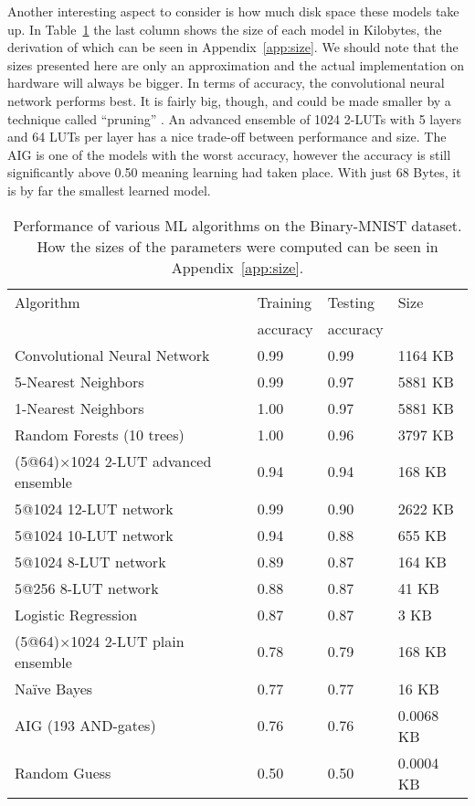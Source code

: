 \noindent Another interesting aspect to consider is how much disk space these models take up. In Table~\ref{tab:ml_algos_on_bmnist} the last column shows the size of each model in Kilobytes, the derivation of which can be seen in Appendix~\ref{app:size}. We should note that the sizes presented here are only an approximation and the actual implementation on hardware will always be bigger. In terms of accuracy, the convolutional neural network performs best. It is fairly big, though, and could be made smaller by a technique called \enquote{pruning} \cite{bib:molchanov2016pruning}. An advanced ensemble of 1024 2-LUTs with 5 layers and 64 LUTs per layer has a nice trade-off between performance and size. The AIG is one of the models with the worst accuracy, however the accuracy is still significantly above 0.50 meaning learning had taken place. With just 68 Bytes, it is by far the smallest learned model.

\begin{table}[!htb]
    \begin{small}
        \begin{tabular}{llll}
        Algorithm & Training    & Testing    & Size               \\
                  & accuracy    & accuracy   &                    \\ \hline
        Convolutional Neural Network & 0.99  & 0.99 & 1164 KB     \\
        5-Nearest Neighbors          & 0.99  & 0.97 & 5881 KB     \\
        1-Nearest Neighbors          & 1.00  & 0.97 & 5881 KB     \\
        Random Forests (10 trees)    & 1.00  & 0.96 & 3797 KB     \\
        (5@64)$\times$1024 2-LUT advanced ensemble    & 0.94  & 0.94 & 168 KB      \\
        5@1024 12-LUT network        & 0.99  & 0.90 & 2622 KB     \\
        5@1024 10-LUT network        & 0.94  & 0.88 & 655 KB      \\
        5@1024 8-LUT network         & 0.89  & 0.87 & 164 KB      \\
        5@256 8-LUT network          & 0.88  & 0.87 & 41 KB       \\
        Logistic Regression          & 0.87  & 0.87 & 3 KB        \\
        (5@64)$\times$1024 2-LUT plain ensemble     & 0.78  & 0.79 & 168 KB      \\
        Naïve Bayes                  & 0.77  & 0.77 & 16 KB       \\
        AIG (193 AND-gates)          & 0.76  & 0.76 & 0.0068 KB   \\
        Random Guess                 & 0.50  & 0.50 & 0.0004 KB
        \end{tabular}
    \end{small}
    \caption{Performance of various ML algorithms on the Binary-MNIST dataset. How the sizes of the parameters were computed can be seen in Appendix~\ref{app:size}. }
\label{tab:ml_algos_on_bmnist}
\end{table}

